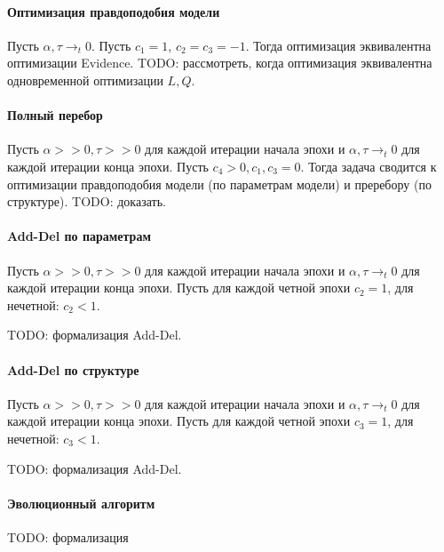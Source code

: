 \documentclass[12pt]{article}
\begin{document}
\paragraph{Оптимизация правдоподобия модели}
Пусть $\alpha, \tau \to_t 0.$
Пусть $c_1 = 1$, $c_2 = c_3 = -1$. Тогда оптимизация эквивалентна оптимизации Evidence. 
TODO: рассмотреть, когда оптимизация эквивалентна одновременной оптимизации $L,Q$.

\paragraph{Полный перебор}
Пусть $\alpha >> 0, \tau >> 0$ для каждой итерации начала эпохи и $\alpha, \tau \to_t 0$ для каждой итерации конца эпохи.
Пусть $c_4 > 0, c_1,c_3 = 0.$ Тогда задача сводится к оптимизации правдоподобия модели (по параметрам модели) и преребору (по структуре).
TODO: доказать.

\paragraph{Add-Del по параметрам}
Пусть $\alpha >> 0, \tau >> 0$ для каждой итерации начала эпохи и $\alpha, \tau \to_t 0$ для каждой итерации конца эпохи.
Пусть для каждой четной эпохи $c_2 = 1$, для нечетной: $c_2 < 1$.

TODO: формализация Add-Del.


\paragraph{Add-Del по структуре}
Пусть $\alpha >> 0, \tau >> 0$ для каждой итерации начала эпохи и $\alpha, \tau \to_t 0$ для каждой итерации конца эпохи.
Пусть для каждой четной эпохи $c_3 = 1$, для нечетной: $c_3 < 1$.

TODO: формализация Add-Del.

 
\paragraph{Эволюционный алгоритм}
TODO: формализация
\end{document}
